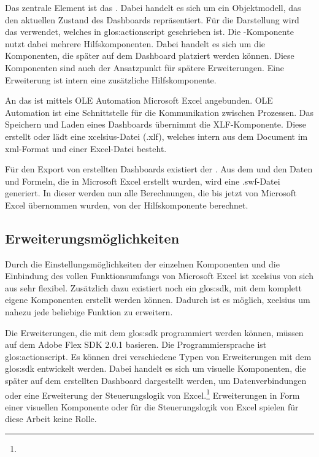 \begin{onehalfspacing}
Das zentrale Element ist das . Dabei handelt es sich um ein Objektmodell, das den aktuellen Zustand des Dashboards repräsentiert. Für die Darstellung wird das  verwendet, welches in \gls{glos:actionscript} geschrieben ist. Die -Komponente nutzt dabei mehrere Hilfskomponenten. Dabei handelt es sich um die Komponenten, die später auf dem Dashboard platziert werden können. Diese Komponenten sind auch der Ansatzpunkt für spätere Erweiterungen. Eine Erweiterung ist intern eine zusätzliche Hilfskomponente.

An das  ist mittels OLE Automation Microsoft Excel angebunden. OLE Automation ist eine Schnittstelle für die Kommunikation zwischen Prozessen. Das Speichern und Laden eines Dashboards übernimmt die XLF-Komponente. Diese erstellt oder lädt eine \gls{xcelsius}-Datei (.xlf), welches intern aus dem Document im \gls{xml}-Format und einer Excel-Datei besteht.

Für den Export von erstellten Dashboards existiert der . Aus dem  und den Daten und Formeln, die in Microsoft Excel erstellt wurden, wird eine .swf-Datei generiert. In dieser werden nun alle Berechnungen, die bis jetzt von Microsoft Excel übernommen wurden, von der Hilfskomponente  berechnet.

\subsection{Erweiterungsmöglichkeiten}

Durch die Einstellungsmöglichkeiten der einzelnen Komponenten und die Einbindung des vollen Funktionsumfangs von Microsoft Excel ist \gls{xcelsius} von sich aus sehr flexibel. Zusätzlich dazu existiert noch ein \gls{glos:sdk}, mit dem komplett eigene Komponenten erstellt werden können. Dadurch ist es möglich, \gls{xcelsius} um nahezu jede beliebige Funktion zu erweitern.

Die Erweiterungen, die mit dem \gls{glos:sdk} programmiert werden können, müssen auf dem Adobe Flex SDK 2.0.1 basieren. Die Programmiersprache ist \gls{glos:actionscript}. Es können drei verschiedene Typen von Erweiterungen mit dem \gls{glos:sdk} entwickelt werden. Dabei handelt es sich um visuelle Komponenten, die später auf dem erstellten Dashboard dargestellt werden, um Datenverbindungen oder eine Erweiterung der Steuerungslogik von Excel.\footnote{ } Erweiterungen in Form einer visuellen Komponente oder für die Steuerungslogik von Excel spielen für diese Arbeit keine Rolle.


\end{onehalfspacing}

